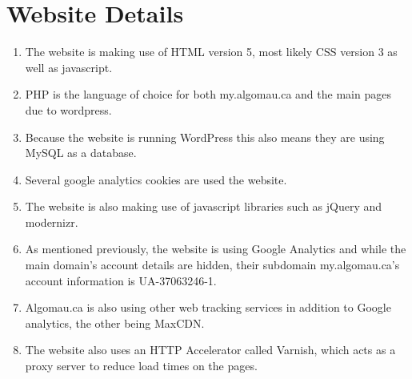 \documentclass[a4paper, 11pt]{article}
\begin{document}
\section*{Website Details}
\begin{enumerate}
\item The website is making use of HTML version 5, most likely CSS version 3 as well as javascript.
\item PHP is the language of choice for both my.algomau.ca and the main pages due to wordpress.  
\item Because the website is running WordPress this also means they are using MySQL as a database.
\item Several google analytics cookies are used the website.
\item The website is also making use of javascript libraries such as jQuery and modernizr.
\item As mentioned previously, the website is using Google Analytics and while the main domain's account details are hidden, their subdomain my.algomau.ca's account information is UA-37063246-1.
\item Algomau.ca is also using other web tracking services in addition to Google analytics, the other being MaxCDN.
\item The website also uses an HTTP Accelerator called Varnish, which acts as a proxy server to reduce load times on the pages. 
\end{enumerate}
\end{document}
